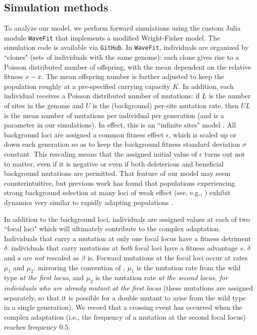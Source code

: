 \documentclass[rmp]{revtex4}
\begin{document}
\begin{spacing}{1.5}
\section{Simulation methods}

To analyze our model, we perform forward simulations using the custom Julia module \texttt{WaveFit} that implements a modified Wright-Fisher model.
The simulation code is available via \texttt{GitHub}.
In \texttt{WaveFit}, individuals are organized by ``clones" (sets of individuals with the same genome): each clone gives rise to a Poisson distributed number of offspring, with the mean dependent on the relative fitness $x-\bar{x}$.
The mean offspring number is further adjusted to keep the population roughly at a pre-specified carrying capacity $K$.
In addition, each individual receives a Poisson distributed number of mutations: if $L$ is the number of sites in the genome and $U$ is the (background) per-site mutation rate, then $UL$ is the mean number of mutations per individual per generation (and is a parameter in our simulations).
In effect, this is an ``infinite sites" model \citep{Kimura:1971,Watterson:1975}.
All background loci are assigned a common fitness effect $\epsilon$, which is scaled up or down each generation so as to keep the background fitness standard deviation $\sigma$ constant.
This rescaling means that the assigned initial value of $\epsilon$ turns out not to matter, even if it is negative or even if both deleterious and beneficial background mutations are permitted.
That feature of our model may seem counterintuitive, but previous work has found that populations experiencing strong background selection at many loci of weak effect (see, e.g., \citet{cvijovic_2015}) exhibit dynamics very similar to rapidly adapting populations \citep{desai_fisher_2007, neher_shraiman_2011}.

In addition to the background loci, individuals are assigned values at each of two ``focal loci" which will ultimately contribute to the complex adaptation.
Individuals that carry a mutation at only one focal locus have a fitness detriment $\delta$: individuals that carry mutations at \emph{both} focal loci have a fitness advantage $s$.
$\delta$ and $s$ are \emph{not} rescaled as $\beta$ is.
Forward mutations at the focal loci occur at rates $\mu_1$ and $\mu_2$: mirroring the convention of \citet{weissman_2009}, $\mu_1$ is the mutation rate from the wild type \emph{at the first locus}, and $\mu_2$ is the mutation rate \emph{at the second locus, for individuals who are already mutant at the first locus} (these mutations are assigned separately, so that it is possible for a double mutant to arise from the wild type in a single generation).
We record that a crossing event has occurred when the complex adaptation (i.e., the frequency of a mutation at the second focal locus) reaches frequency $0.5$.


\end{spacing}
\end{document}
